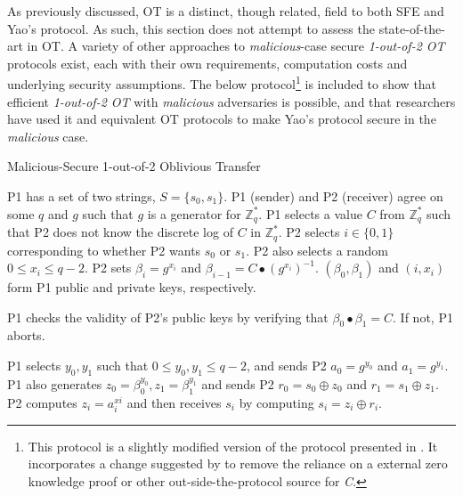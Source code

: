 As previously discussed, \ac{OT} is a distinct, though related, field to both \ac{SFE} and Yao's protocol.  As such, this section does not attempt to assess the state-of-the-art in \ac{OT}.  A variety of other approaches to \emph{malicious}-case secure \emph{1-out-of-2 \ac{OT}} protocols exist\cite{naor2001efficient, kiraz2006protocol, goldreich1987play, naor2005computationally}, each with their own requirements, computation costs and underlying security assumptions.  The below protocol\cite{bellare1990non}\footnote{This protocol is a slightly modified version of the protocol presented in \cite{bellare1990non}.  It incorporates a change suggested by \cite{naor2001efficient} to remove the reliance on a external zero knowledge proof or other out-side-the-protocol source for \emph{C}.} is included to show that efficient \emph{1-out-of-2 \ac{OT}} with \emph{malicious} adversaries is possible, and that researchers have used it and equivalent \ac{OT} protocols to make Yao's protocol secure in the \emph{malicious} case.

\begin{algorithm}[H]
    \caption{Malicious-Secure 1-out-of-2 Oblivious Transfer}
    \label{alg:otmalicious}
    \begin{algorithmic}[1]
        \STATE \ac{P1} has a set of two strings, $S = \{s_0, s_1\}$.
        \STATE \ac{P1} (sender) and \ac{P2} (receiver) agree on some $q$ and $g$ such that $g$ is a generator for $\mathbb{Z}^*_q$.
        \STATE \ac{P1} selects a value  $C$ from $\mathbb{Z}^*_q$ such that \ac{P2} does not know the discrete log of $C$ in $\mathbb{Z}^*_q$.
        \STATE \ac{P2} selects $i \in \{0, 1\}$ corresponding to whether \ac{P2} wants $s_0$ or $s_1$. \ac{P2} also selects a random $0 \leq x_i \leq q-2$.
        \STATE \ac{P2} sets $\beta_i = g^{x_i}$ and $\beta_{i-1} = C \bullet (g^{x_i})^{-1}$. $(\beta_0, \beta_1)$ and $(i, x_i)$ form \ac{P1} public and private keys, respectively.

        \STATE \ac{P1} checks the validity of \ac{P2}'s public keys by verifying that $\beta_0 \bullet \beta_1 = C$.  If not, \ac{P1} aborts.

        \STATE \ac{P1} selects $y_0, y_1$ such that $0 \leq y_0, y_1 \leq q-2$, and sends \ac{P2} $a_0 = g^{y_0}$ and $a_1 = g^{y_1}$.
        \STATE \ac{P1} also generates $z_0 = \beta^{y_0}_0, z_1 = \beta^{y_1}_1$ and sends \ac{P2} $r_0 = s_0 \oplus z_0$ and $r_1 = s_1 \oplus z_1$.
        \STATE \ac{P2} computes $z_i = a^{xi}_i$ and then receives $s_i$ by computing $s_i = z_i \oplus r_i$.
    \end{algorithmic}
\end{algorithm}

